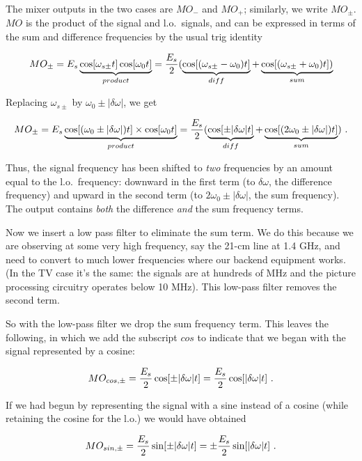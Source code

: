\documentclass[11pt,preprint]{aastex}
\begin{document}
        The mixer outputs in the two cases are $MO_-$ and $MO_+$;
similarly, we write $MO_{\pm}$. $MO$ is the product of the signal and
l.o.~signals, and can be expressed in terms of the sum and difference
frequencies by the usual trig identity

\begin{mathletters}
\begin{equation}
MO_{\pm} = E_s \underbrace{\cos [\omega_{s \pm} t] \cos [\omega_0 t]
}_{product} =
        {E_s \over 2} (\underbrace {\cos [(\omega_{s\pm} - \omega_0)t
	]}_{diff} +
        \underbrace { \cos [(\omega_{s\pm} + \omega_0)t]) }_{sum}
\end{equation}

\noindent Replacing $\omega_{s\pm}$ by $\omega_0 \pm |\delta \omega|$,
we get


\begin{equation} \label{mopm}
MO_{\pm} = E_s \underbrace{\cos [(\omega_0 \pm |\delta \omega |)t]
\times
\cos [\omega_0 t]}_{product} = {E_s \over 2}
        (\underbrace{ \cos [\pm|\delta \omega | t]}_{diff} +
        \underbrace{ \cos[(2\omega_0 \pm |\delta \omega |) t]}_{sum} ) \
.
\end{equation}
\end{mathletters}

\noindent Thus, the signal frequency has been shifted to {\it two}
frequencies by an amount equal to the l.o.\ frequency:  downward in the
first term (to $\delta \omega $, the difference frequency) and upward
in the second term (to $2\omega_0 \pm |\delta \omega |$, the sum
frequency).  The output contains {\it both} the difference {\it and} the
sum frequency terms.

        Now we insert a low pass filter to eliminate the sum term. We do
this because we are observing at some very high frequency, say the 21-cm
line at 1.4 GHz, and need to convert to much lower frequencies where our
backend equipment works. (In the TV case it's the same: the signals are
at hundreds of MHz and the picture processing circuitry operates below
10 MHz). This low-pass filter removes the second term.

        So with the low-pass filter we drop the sum frequency term. This
leaves the following, in which we add the subscript $cos$ to indicate
that we began with the signal represented by a cosine:

\begin{mathletters} \label{baseband}
\begin{equation}
MO_{cos,\pm} = {E_s \over 2} \cos [\pm|\delta \omega | t] = {E_s \over
  2}
   \cos [|\delta \omega | t] \ .
\end{equation}

\noindent If we had begun by representing the signal with a sine instead
of a cosine (while retaining the cosine for the l.o.) we would have
obtained

\begin{equation}
MO_{sin,\pm} = {E_s \over 2} \sin [\pm|\delta \omega | t] = \pm {E_s
  \over 2}
   \sin [|\delta \omega | t] \ .
\end{equation}
\end{mathletters}
\end{document}
